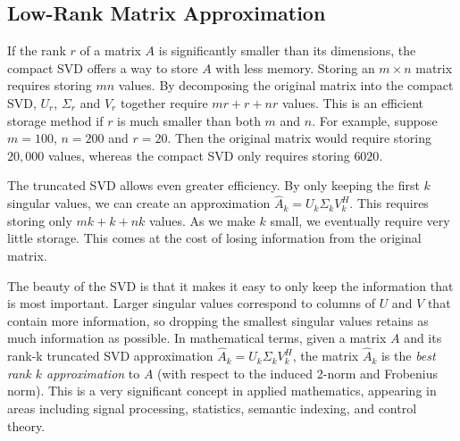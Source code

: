 \subsection*{Low-Rank Matrix Approximation}
If the rank $r$ of a matrix $A$ is significantly smaller than its dimensions, the compact SVD offers a way to store $A$ with less memory.
Storing an $m\times n$ matrix requires storing $mn$ values.
By decomposing the original matrix into the compact SVD, $U_r$, $\Sigma_r$ and $V_r$ together require $mr+r+nr$ values.
This is an efficient storage method if $r$ is much smaller than both $m$ and $n$.
For example, suppose $m=100$, $n=200$ and $r=20$.
Then the original matrix would require storing $20,000$ values, whereas the compact SVD only requires storing $6020$.

The truncated SVD allows even greater efficiency.
By only keeping the first $k$ singular values, we can create an approximation $\widehat A_k = U_k\Sigma_k V_k^H$.
This requires storing only $mk+k+nk$ values.
As we make $k$ small, we eventually require very little storage. This comes at the cost of losing information from the original matrix.

The beauty of the SVD is that it makes it easy to only keep the information that is most important. 
Larger singular values correspond to columns of $U$ and $V$ that contain more information, so dropping the smallest singular values retains as much information as possible.
In mathematical terms, given a matrix $A$ and its rank-k truncated SVD approximation $\widehat A_k = U_k\Sigma_k V_k^H$, the matrix $\widehat A_k$ is the \emph{best rank $k$ approximation} to $A$ (with respect to the induced 2-norm and Frobenius norm).
This is a very significant concept in applied mathematics, appearing in areas including signal processing, statistics, semantic indexing, and control theory.

